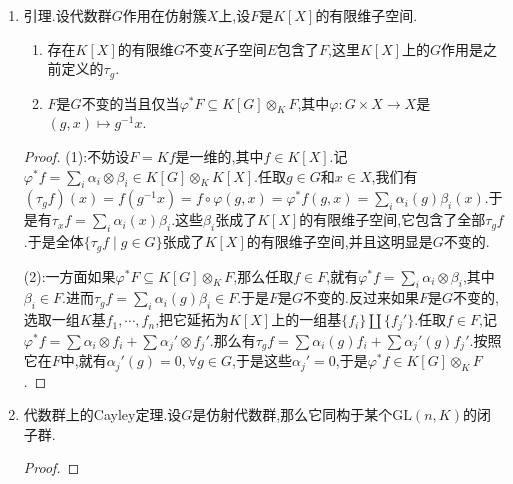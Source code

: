 \begin{enumerate}
\begin{enumerate}[(1)]
\begin{proof}
    		一方面任取$h,h'\in H$,任取$f\in I$,那么有$(R_hf)(h')=f(h'h)=0$.于是有$R_hf\subseteq I$.反过来如果$g\in G$满足$R_g(I)\subseteq I$,对任意$f\in I$,有$R_gf(e)=f(g)=0$,于是$g\in H$(零点定理).
    	\end{proof}
        \item 函子性.设$H\le G$是闭子群,设$h\in H$,那么有如下交换图表:
        $$\xymatrix{K[G]\ar[rr]^{R_h}\ar[d]&&K[G]\ar[d]\\K[H]\ar[rr]_{R_h}&&K[H]}$$
        \item 设$\varphi:G\to G'$是代数群之间的满态射,那么$\varphi^*$是单射,把$K[G']$映为$K[G]$的子环.那么任取$g\in G$,就有$R_{\varphi(g)}$是$R_g$在子环$K[G']$上的限制.类似的有$D_{\mathrm{d}\varphi(v)}$是$D_v$在子环$K[G']$上的限制.
    \end{enumerate}
    \item 引理.设代数群$G$作用在仿射簇$X$上,设$F$是$K[X]$的有限维子空间.
    \begin{enumerate}[(1)]
    	\item 存在$K[X]$的有限维$G$不变$K$子空间$E$包含了$F$,这里$K[X]$上的$G$作用是之前定义的$\tau_g$.
    	\item $F$是$G$不变的当且仅当$\varphi^*F\subseteq K[G]\otimes_KF$,其中$\varphi:G\times X\to X$是$(g,x)\mapsto g^{-1}x$.
    \end{enumerate}
    \begin{proof}
    	
    	(1):不妨设$F=Kf$是一维的,其中$f\in K[X]$.记$\varphi^*f=\sum_i\alpha_i\otimes\beta_i\in K[G]\otimes_KK[X]$.任取$g\in G$和$x\in X$,我们有$(\tau_gf)(x)=f(g^{-1}x)=f\circ\varphi(g,x)=\varphi^*f(g,x)=\sum_i\alpha_i(g)\beta_i(x)$.于是有$\tau_xf=\sum_i\alpha_i(x)\beta_i$.这些$\beta_i$张成了$K[X]$的有限维子空间,它包含了全部$\tau_gf$.于是全体$\{\tau_gf\mid g\in G\}$张成了$K[X]$的有限维子空间,并且这明显是$G$不变的.
    	
    	\qquad
    	
    	(2):一方面如果$\varphi^*F\subseteq K[G]\otimes_KF$,那么任取$f\in F$,就有$\varphi^*f=\sum_i\alpha_i\otimes\beta_i$,其中$\beta_i\in F$.进而$\tau_gf=\sum_i\alpha_i(g)\beta_i\in F$.于是$F$是$G$不变的.反过来如果$F$是$G$不变的,选取一组$K$基$f_1,\cdots,f_n$,把它延拓为$K[X]$上的一组基$\{f_i\}\coprod\{f_j'\}$.任取$f\in F$,记$\varphi^*f=\sum\alpha_i\otimes f_i+\sum\alpha_j'\otimes f_j'$.那么有$\tau_gf=\sum\alpha_i(g)f_i+\sum\alpha_j'(g)f_j'$.按照它在$F$中,就有$\alpha_j'(g)=0,\forall g\in G$,于是这些$\alpha_j'=0$,于是$\varphi^*f\in K[G]\otimes_KF$.
    \end{proof}
    \item 代数群上的Cayley定理.设$G$是仿射代数群,那么它同构于某个$\mathrm{GL}(n,K)$的闭子群.
    \begin{proof}
    	

\end{proof}
\end{enumerate}
